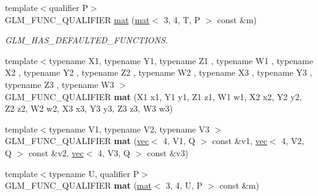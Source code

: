 \begin{DoxyCompactItemize}
\item 
\mbox{\label{structglm_1_1mat_3_013_00_014_00_01T_00_01Q_01_4_ad1252e6ae89aae491f450caee79834b6}} 
{\footnotesize template$<$qualifier P$>$ }\\G\+L\+M\+\_\+\+F\+U\+N\+C\+\_\+\+Q\+U\+A\+L\+I\+F\+I\+ER \hyperlink{structglm_1_1mat_3_013_00_014_00_01T_00_01Q_01_4_ad1252e6ae89aae491f450caee79834b6}{mat} (\hyperlink{structglm_1_1mat}{mat}$<$ 3, 4, T, P $>$ const \&m)
\begin{DoxyCompactList}\small\item\em G\+L\+M\+\_\+\+H\+A\+S\+\_\+\+D\+E\+F\+A\+U\+L\+T\+E\+D\+\_\+\+F\+U\+N\+C\+T\+I\+O\+NS. \end{DoxyCompactList}\item 
\mbox{\label{structglm_1_1mat_3_013_00_014_00_01T_00_01Q_01_4_a001544c721e535f5e618ae9f3ff03c9a}} 
{\footnotesize template$<$typename X1, typename Y1, typename Z1 , typename W1 , typename X2 , typename Y2 , typename Z2 , typename W2 , typename X3 , typename Y3 , typename Z3 , typename W3 $>$ }\\G\+L\+M\+\_\+\+F\+U\+N\+C\+\_\+\+Q\+U\+A\+L\+I\+F\+I\+ER {\bfseries mat} (X1 x1, Y1 y1, Z1 z1, W1 w1, X2 x2, Y2 y2, Z2 z2, W2 w2, X3 x3, Y3 y3, Z3 z3, W3 w3)
\item 
\mbox{\label{structglm_1_1mat_3_013_00_014_00_01T_00_01Q_01_4_ab5ab8c89bf0c09b7d29e8fe766315130}} 
{\footnotesize template$<$typename V1, typename V2, typename V3 $>$ }\\G\+L\+M\+\_\+\+F\+U\+N\+C\+\_\+\+Q\+U\+A\+L\+I\+F\+I\+ER {\bfseries mat} (\hyperlink{structglm_1_1vec}{vec}$<$ 4, V1, Q $>$ const \&v1, \hyperlink{structglm_1_1vec}{vec}$<$ 4, V2, Q $>$ const \&v2, \hyperlink{structglm_1_1vec}{vec}$<$ 4, V3, Q $>$ const \&v3)
\item 
\mbox{\label{structglm_1_1mat_3_013_00_014_00_01T_00_01Q_01_4_afa0a1833aa62131486fddb5efbdadd5e}} 
{\footnotesize template$<$typename U, qualifier P$>$ }\\G\+L\+M\+\_\+\+F\+U\+N\+C\+\_\+\+Q\+U\+A\+L\+I\+F\+I\+ER {\bfseries mat} (\hyperlink{structglm_1_1mat}{mat}$<$ 3, 4, U, P $>$ const \&m)
\item 
\mbox{\label{structglm_1_1mat_3_013_00_014_00_01T_00_01Q_01_4_a3ca0ae1ed188a28294b9e21ffc31e175}} 

\end{DoxyCompactItemize}
